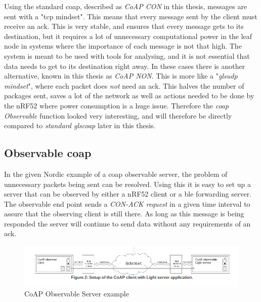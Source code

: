 Using the standard \gls{coap}, described as \textit{CoAP CON} in this thesis, messages are sent with a "\gls{tcp} mindset". This means that every message sent by the client must receive an \gls {ack}. This is very stable, and ensures that every message gets to its destination, but it requires a lot of unnecessary computational power in the leaf node in systems where the importance of each message is not that high. The system is meant to be used with tools for analysing, and it is not essential that data needs to get to its destination right away. In these cases there is another alternative, known in this thesis as \textit{CoAP NON}. This is more like a "\textit{gls{udp} mindset}", where each packet does \textit{not} need an \gls{ack}. This halves the number of packages sent, saves a lot of the network as well as actions needed to be done by the nRF52 where power consumption is a huge issue. Therefore the \textit{\gls{coap} Observable} function looked very interesting, and will therefore be directly compared to \textit{standard gls{coap}} later in this thesis.   



\subsection{Observable \gls{coap}}

In the given Nordic example of a \gls{coap} observable server, the problem of unnecessary packets being sent can be resolved. Using this it is easy to set up a server that can be observed by either a nRF52 client or a \gls{ble} forwarding server. The observable end point sends a \textit{CON-ACK request} in a given time interval to assure that the observing client is still there. As long as this message is being responded the server will continue to send data without any requirements of an \gls{ack}. 

\begin{figure}[ht]
    \centering
    \includegraphics[scale=0.47]{CoAPObservalbFigure2.png}    
    \caption{CoAP Observable Server example}
    \label{fig:CoAPexample1}
\end{figure}



